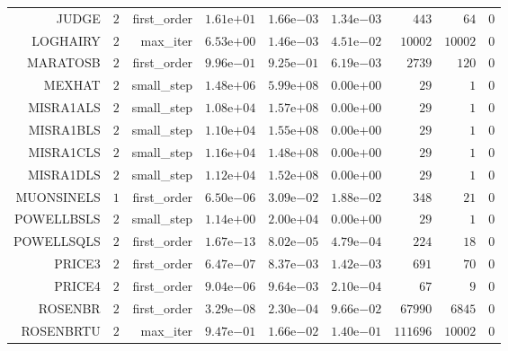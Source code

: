 \begin{longtable}{rrrrrrrrr}
JUDGE & \(     2\) & first\_order & \( 1.61\)e\(+01\) & \( 1.66\)e\(-03\) & \( 1.34\)e\(-03\) & \(   443\) & \(    64\) & \(     0\) \\
LOGHAIRY & \(     2\) & max\_iter & \( 6.53\)e\(+00\) & \( 1.46\)e\(-03\) & \( 4.51\)e\(-02\) & \( 10002\) & \( 10002\) & \(     0\) \\
MARATOSB & \(     2\) & first\_order & \( 9.96\)e\(-01\) & \( 9.25\)e\(-01\) & \( 6.19\)e\(-03\) & \(  2739\) & \(   120\) & \(     0\) \\
MEXHAT & \(     2\) & small\_step & \( 1.48\)e\(+06\) & \( 5.99\)e\(+08\) & \( 0.00\)e\(+00\) & \(    29\) & \(     1\) & \(     0\) \\
MISRA1ALS & \(     2\) & small\_step & \( 1.08\)e\(+04\) & \( 1.57\)e\(+08\) & \( 0.00\)e\(+00\) & \(    29\) & \(     1\) & \(     0\) \\
MISRA1BLS & \(     2\) & small\_step & \( 1.10\)e\(+04\) & \( 1.55\)e\(+08\) & \( 0.00\)e\(+00\) & \(    29\) & \(     1\) & \(     0\) \\
MISRA1CLS & \(     2\) & small\_step & \( 1.16\)e\(+04\) & \( 1.48\)e\(+08\) & \( 0.00\)e\(+00\) & \(    29\) & \(     1\) & \(     0\) \\
MISRA1DLS & \(     2\) & small\_step & \( 1.12\)e\(+04\) & \( 1.52\)e\(+08\) & \( 0.00\)e\(+00\) & \(    29\) & \(     1\) & \(     0\) \\
MUONSINELS & \(     1\) & first\_order & \( 6.50\)e\(-06\) & \( 3.09\)e\(-02\) & \( 1.88\)e\(-02\) & \(   348\) & \(    21\) & \(     0\) \\
POWELLBSLS & \(     2\) & small\_step & \( 1.14\)e\(+00\) & \( 2.00\)e\(+04\) & \( 0.00\)e\(+00\) & \(    29\) & \(     1\) & \(     0\) \\
POWELLSQLS & \(     2\) & first\_order & \( 1.67\)e\(-13\) & \( 8.02\)e\(-05\) & \( 4.79\)e\(-04\) & \(   224\) & \(    18\) & \(     0\) \\
PRICE3 & \(     2\) & first\_order & \( 6.47\)e\(-07\) & \( 8.37\)e\(-03\) & \( 1.42\)e\(-03\) & \(   691\) & \(    70\) & \(     0\) \\
PRICE4 & \(     2\) & first\_order & \( 9.04\)e\(-06\) & \( 9.64\)e\(-03\) & \( 2.10\)e\(-04\) & \(    67\) & \(     9\) & \(     0\) \\
ROSENBR & \(     2\) & first\_order & \( 3.29\)e\(-08\) & \( 2.30\)e\(-04\) & \( 9.66\)e\(-02\) & \( 67990\) & \(  6845\) & \(     0\) \\
ROSENBRTU & \(     2\) & max\_iter & \( 9.47\)e\(-01\) & \( 1.66\)e\(-02\) & \( 1.40\)e\(-01\) & \(111696\) & \( 10002\) & \(     0\) \\

\end{longtable}
